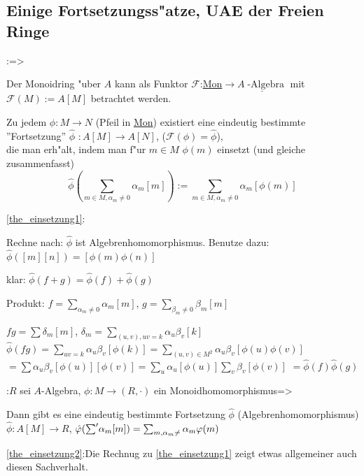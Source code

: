 \subsection{Einige Fortsetzungss"atze, UAE der Freien Ringe}
:{}=>{
 \label{the_einsetzung1}
 Der Monoidring "uber $A$ kann als Funktor
 $\mathcal{F}$:\underline{Mon}$\longrightarrow \underline{A\operatorname{-Algebra}}$
 mit $\mathcal{F}(M):=A[M]$ betrachtet werden.
 
 Zu jedem $\phi: M\longrightarrow N$ 
 (Pfeil in \underline{Mon}) existiert eine eindeutig bestimmte ''Fortsetzung'' $\hat\phi$
 $:A[M]\longrightarrow A[N]$, ($\mathcal{F}(\phi)=\hat\phi$), \\
 die man erh"alt, indem 
 man f"ur $m\in M$ $\phi(m)$ einsetzt (und gleiche zusammenfasst)
 \[\hat\phi(\sum_{m\in M,\alpha_m \neq 0} \alpha_m[m]):= 
 \sum_{m\in M,\alpha_m \neq 0}\alpha_m[\phi(m)]\]
}
\proof \ref{the_einsetzung1}:{Rechne nach: $\hat\phi$ ist 
 Algebrenhomomorphismus. Benutze dazu: $\hat\phi([m][n])=[\phi(m)\phi(n)]$

 klar: $\hat\phi(f+g)=\hat\phi(f)+\hat\phi(g)$

 Produkt: $f=\sum_{\alpha_m \neq 0} \alpha_m [m]$, $g=\sum_{\beta_m \neq 0}\beta_m [m]$

 $fg=\sum \delta_m [m]$, $\delta_m=\sum_{(u,v),uv=k}\alpha_u\beta_v[k]$\\
 $\hat\phi(fg)=\sum_{uv=k}\alpha_u\beta_v[\phi(k)]=\sum_{(u,v)\in M^2}\alpha_u\beta_v[\phi(u)\phi(v)]$
 $=\sum \alpha_u\beta_v[\phi(u)][\phi(v)]=\sum_{u}\alpha_u[\phi(u)]\sum_v \beta_v[\phi(v)]$
 $=\hat\phi(f)\hat\phi(g)$
}
\theorem{}:{$R$ sei $A$-Algebra, $\phi:M\longrightarrow (R,\cdot)$ ein
Monoidhomomorphismus}=>{
\label{the_einsetzung2}Dann gibt es eine eindeutig bestimmte Fortsetzung $\hat\phi$
(Algebrenhomomorphismus)\\
$\hat\phi:A[M]\longrightarrow R$, $\hat{\varphi}({\sum\nolimits'} \alpha_m[m])=\sum_{m,\alpha_m \neq}\alpha_m \varphi(m)$

}
\proof \ref{the_einsetzung2}:{Die Rechnug zu \ref{the_einsetzung1} zeigt etwas allgemeiner  
auch diesen Sachverhalt.}
